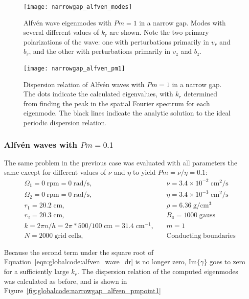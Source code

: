 \documentclass[letterpaper]{article}
\begin{document}
\begin{figure}
\centering
\texttt{[image: narrowgap\_alfven\_modes]}
\caption[Alfv\'en wave eigenmodes with $Pm=1$ in a narrow
  gap]{Alfv\'en wave eigenmodes with $Pm=1$ in a narrow gap. Modes
  with several different values of $k_r$ are shown. Note the two
  primary polarizations of the wave: one with perturbations primarily
  in $v_r$ and $b_r$, and the other with perturbations primarily in
  $v_z$ and $b_z$.}
\label{fig:globalcode:narrowgap_alfven_modes}
\end{figure}

\begin{figure}
\centering
\texttt{[image: narrowgap\_alfven\_pm1]}
\caption[Dispersion relation of Alfv\'en waves with $Pm=1$ in a narrow
  gap]{Dispersion relation of Alfv\'en waves with $Pm=1$ in a narrow
  gap. The dots indicate the calculated eigenvalues, with $k_r$
  determined from finding the peak in the spatial Fourier spectrum for
  each eigenmode. The black lines indicate the analytic solution to
  the ideal periodic dispersion relation.}
\label{fig:globalcode:narrowgap_alfven_pm1}
\end{figure}


\subsubsection{Alfv\'en waves with $Pm=0.1$}

The same problem in the previous case was evaluated with all
parameters the same except for different values of $\nu$ and $\eta$ to
yield $Pm = \nu/\eta = 0.1$:
\begin{align*}
&\Omega_1 = 0\;\mathrm{rpm} = 0\;\mathrm{rad/s},\quad
    &\nu = 3.4\times10^{-2}\;\mathrm{cm^2/s}
\\
&\Omega_2 = 0\;\mathrm{rpm} = 0\;\mathrm{rad/s},\quad
    &\eta = 3.4\times10^{-3}\;\mathrm{cm^2/s}
\\
&r_1 = 20.2\;\mathrm{cm},\quad &\rho = 6.36\;\mathrm{g/cm^3}
\\
&r_2 = 20.3\;\mathrm{cm},\quad &B_0 = 1000\; \mathrm{gauss}
\\
&k = 2\pi n/h = 2\pi*500/100\;\mathrm{cm} = 31.4\;\mathrm{cm^{-1}},\quad
    &m=1
\\
&N = 2000\;\mathrm{grid\;cells},\quad &\mathrm{Conducting\;boundaries}
\end{align*}

Because the second term under the square root of
Equation~\ref{eqn:globalcode:alfven_wave_dr} is no longer zero,
$\mathrm{Im}\{\gamma\}$ goes to zero for a sufficiently large
$k_r$. The dispersion relation of the computed eigenmodes was
calculated as before, and is shown in
Figure~\ref{fig:globalcode:narrowgap_alfven_pmpoint1}
\end{document}
